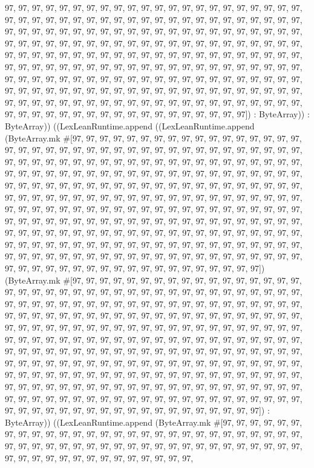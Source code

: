 \documentclass[11pt]{article}
\begin{document}
97, 97, 97, 97, 97, 97, 97, 97, 97, 97, 97, 97, 97, 97, 97, 97, 97, 97, 97, 97, 97, 97, 97, 97, 97, 97, 97, 97, 97, 97, 97, 97, 97, 97, 97, 97, 97, 97, 97, 97, 97, 97, 97, 97, 97, 97, 97, 97, 97, 97, 97, 97, 97, 97, 97, 97, 97, 97, 97, 97, 97, 97, 97, 97, 97, 97, 97, 97, 97, 97, 97, 97, 97, 97, 97, 97, 97, 97, 97, 97, 97, 97, 97, 97, 97, 97, 97, 97, 97, 97, 97, 97, 97, 97, 97, 97, 97, 97, 97, 97, 97, 97, 97, 97, 97, 97, 97, 97, 97, 97, 97, 97, 97, 97, 97, 97, 97, 97, 97, 97, 97, 97, 97, 97, 97, 97, 97, 97, 97, 97, 97, 97, 97, 97, 97, 97, 97, 97, 97, 97, 97, 97, 97, 97, 97, 97, 97, 97, 97, 97, 97, 97, 97, 97, 97, 97, 97, 97, 97, 97, 97, 97, 97, 97, 97, 97, 97, 97, 97, 97, 97, 97, 97, 97, 97, 97, 97, 97, 97, 97, 97, 97, 97, 97, 97, 97, 97, 97, 97, 97, 97, 97, 97, 97, 97, 97, 97, 97, 97, 97, 97, 97, 97, 97, 97, 97, 97, 97, 97, 97, 97, 97, 97, 97, 97, 97]) : ByteArray)) : ByteArray)) ((LexLeanRuntime.append ((LexLeanRuntime.append (ByteArray.mk \#[97, 97, 97, 97, 97, 97, 97, 97, 97, 97, 97, 97, 97, 97, 97, 97, 97, 97, 97, 97, 97, 97, 97, 97, 97, 97, 97, 97, 97, 97, 97, 97, 97, 97, 97, 97, 97, 97, 97, 97, 97, 97, 97, 97, 97, 97, 97, 97, 97, 97, 97, 97, 97, 97, 97, 97, 97, 97, 97, 97, 97, 97, 97, 97, 97, 97, 97, 97, 97, 97, 97, 97, 97, 97, 97, 97, 97, 97, 97, 97, 97, 97, 97, 97, 97, 97, 97, 97, 97, 97, 97, 97, 97, 97, 97, 97, 97, 97, 97, 97, 97, 97, 97, 97, 97, 97, 97, 97, 97, 97, 97, 97, 97, 97, 97, 97, 97, 97, 97, 97, 97, 97, 97, 97, 97, 97, 97, 97, 97, 97, 97, 97, 97, 97, 97, 97, 97, 97, 97, 97, 97, 97, 97, 97, 97, 97, 97, 97, 97, 97, 97, 97, 97, 97, 97, 97, 97, 97, 97, 97, 97, 97, 97, 97, 97, 97, 97, 97, 97, 97, 97, 97, 97, 97, 97, 97, 97, 97, 97, 97, 97, 97, 97, 97, 97, 97, 97, 97, 97, 97, 97, 97, 97, 97, 97, 97, 97, 97, 97, 97, 97, 97, 97, 97, 97, 97, 97, 97, 97, 97, 97, 97, 97, 97, 97, 97, 97, 97, 97, 97, 97, 97, 97, 97, 97, 97, 97, 97, 97, 97, 97, 97, 97, 97, 97, 97, 97, 97, 97, 97, 97, 97, 97, 97, 97, 97, 97, 97, 97, 97, 97, 97, 97, 97, 97, 97]) (ByteArray.mk \#[97, 97, 97, 97, 97, 97, 97, 97, 97, 97, 97, 97, 97, 97, 97, 97, 97, 97, 97, 97, 97, 97, 97, 97, 97, 97, 97, 97, 97, 97, 97, 97, 97, 97, 97, 97, 97, 97, 97, 97, 97, 97, 97, 97, 97, 97, 97, 97, 97, 97, 97, 97, 97, 97, 97, 97, 97, 97, 97, 97, 97, 97, 97, 97, 97, 97, 97, 97, 97, 97, 97, 97, 97, 97, 97, 97, 97, 97, 97, 97, 97, 97, 97, 97, 97, 97, 97, 97, 97, 97, 97, 97, 97, 97, 97, 97, 97, 97, 97, 97, 97, 97, 97, 97, 97, 97, 97, 97, 97, 97, 97, 97, 97, 97, 97, 97, 97, 97, 97, 97, 97, 97, 97, 97, 97, 97, 97, 97, 97, 97, 97, 97, 97, 97, 97, 97, 97, 97, 97, 97, 97, 97, 97, 97, 97, 97, 97, 97, 97, 97, 97, 97, 97, 97, 97, 97, 97, 97, 97, 97, 97, 97, 97, 97, 97, 97, 97, 97, 97, 97, 97, 97, 97, 97, 97, 97, 97, 97, 97, 97, 97, 97, 97, 97, 97, 97, 97, 97, 97, 97, 97, 97, 97, 97, 97, 97, 97, 97, 97, 97, 97, 97, 97, 97, 97, 97, 97, 97, 97, 97, 97, 97, 97, 97, 97, 97, 97, 97, 97, 97, 97, 97, 97, 97, 97, 97, 97, 97, 97, 97, 97, 97, 97, 97, 97, 97, 97, 97, 97, 97, 97, 97, 97, 97, 97, 97, 97, 97, 97, 97, 97, 97, 97, 97, 97, 97]) : ByteArray)) ((LexLeanRuntime.append (ByteArray.mk \#[97, 97, 97, 97, 97, 97, 97, 97, 97, 97, 97, 97, 97, 97, 97, 97, 97, 97, 97, 97, 97, 97, 97, 97, 97, 97, 97, 97, 97, 97, 97, 97, 97, 97, 97, 97, 97, 97, 97, 97, 97, 97, 97, 97, 97, 97, 97, 97, 97, 97, 97, 97, 97, 97, 97, 97, 97, 97, 97, 97, 97, 97, 97, 97, 
\end{document}
